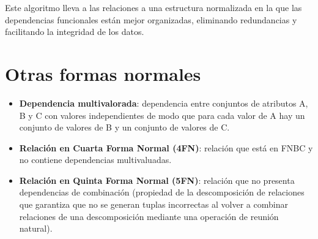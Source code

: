 \documentclass{article}
\begin{document}
Este algoritmo lleva a las relaciones a una estructura normalizada en la que las dependencias funcionales están mejor organizadas, eliminando redundancias y facilitando la integridad de los datos.

\newpage

\section{Otras formas normales}
\begin{itemize}
    \item \textbf{Dependencia multivalorada}: dependencia entre conjuntos de atributos A, B y C con valores independientes de modo que para cada valor de A hay un conjunto de valores de B y un conjunto de valores de C.
    \item \textbf{Relación en Cuarta Forma Normal (4FN)}: relación que está en FNBC y no contiene dependencias multivaluadas.
    \item \textbf{Relación en Quinta Forma Normal (5FN)}: relación que no presenta dependencias de combinación (propiedad de la descomposición de relaciones que garantiza que no se generan tuplas incorrectas al volver a combinar relaciones de una descomposición mediante una operación de reunión natural).
\end{itemize}

\begin{comment}
\begin{figure}[h]
    \centering
    \texttt{[image: Captura\_de\_pantalla\_20241103\_122101.png]}
    \caption{Características de los datos}
    \label{fig:etiqueta}
\end{figure}
\end{comment}
\end{document}
